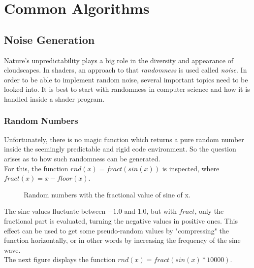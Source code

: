 \section{Common Algorithms}

\subsection{Noise Generation}
\label{section:noise-generation}
Nature's unpredictability plays a big role in the diversity and appearance of cloudscapes. In shaders, an approach to that \textit{randomness} is used called \textit{\gls{noise}}.
In order to be able to implement random \gls{noise}, several important topics need to be looked into. It is best to start with randomness in computer science and how it is handled inside a shader program.

\subsubsection{Random Numbers}
Unfortunately, there is no magic function which returns a pure random number inside the seemingly predictable and rigid code environment.
So the question arises as to how such randomness can be generated.
\\
For this, the function $rnd(x) = fract(sin(x))$ is inspected, where $fract(x) = x - floor(x)$.

\begin{figure}[H]
    \centering
    \caption{Random numbers with the fractional value of sine of x.}
\end{figure}

\noindent
The sine values fluctuate between $-1.0$ and $1.0$, but with $fract$, only the fractional part is evaluated, turning the negative values in positive ones.
This effect can be used to get some pseudo-random values by "compressing" the function horizontally, or in other words by increasing the frequency of the sine wave.
\\
The next figure displays the function $rnd(x) = fract(sin(x) * 10000)$.

